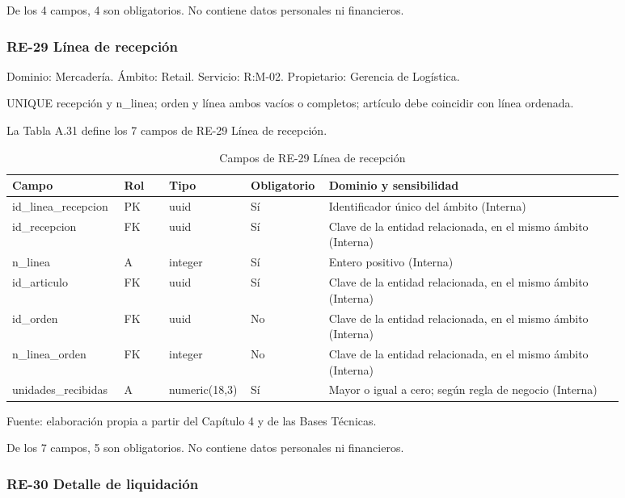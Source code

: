 \documentclass[11pt]{article}
\begin{document}
De los 4 campos, 4 son obligatorios. No contiene datos personales ni financieros.

\subsubsection{RE-29 Línea de recepción}

Dominio: Mercadería. Ámbito: Retail. Servicio: R:M-02. Propietario: Gerencia de Logística.

UNIQUE recepción y n\_linea; orden y línea ambos vacíos o completos; artículo debe coincidir con línea ordenada.

La Tabla A.31 define los 7 campos de RE-29 Línea de recepción.

\begin{table}[htbp]
\caption{Campos de RE-29 Línea de recepción}\label{tab:d_re29}
\centering
\begin{tabular}{@{}p{0.167\linewidth}p{0.070\linewidth}p{0.079\linewidth}p{0.097\linewidth}p{0.465\linewidth}@{}}
\toprule Campo & Rol & Tipo & Obligatorio & Dominio y sensibilidad \\
\midrule
id\_linea\_recepcion & PK & uuid & Sí & Identificador único del ámbito (Interna) \\
id\_recepcion & FK & uuid & Sí & Clave de la entidad relacionada, en el mismo ámbito (Interna) \\
n\_linea & A & integer & Sí & Entero positivo (Interna) \\
id\_articulo & FK & uuid & Sí & Clave de la entidad relacionada, en el mismo ámbito (Interna) \\
id\_orden & FK & uuid & No & Clave de la entidad relacionada, en el mismo ámbito (Interna) \\
n\_linea\_orden & FK & integer & No & Clave de la entidad relacionada, en el mismo ámbito (Interna) \\
unidades\_recibidas & A & numeric(18,3) & Sí & Mayor o igual a cero; según regla de negocio (Interna) \\
\bottomrule
\end{tabular}
\par\smallskip
{\raggedright Fuente: elaboración propia a partir del Capítulo 4 y de las Bases Técnicas.\par}
\end{table}


De los 7 campos, 5 son obligatorios. No contiene datos personales ni financieros.

\subsubsection{RE-30 Detalle de liquidación}
\end{document}
